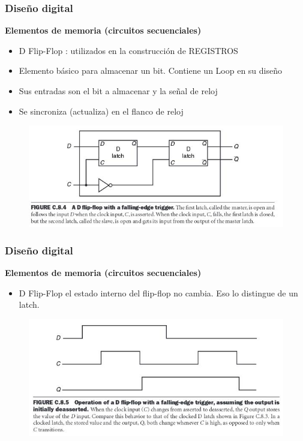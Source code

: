 \documentclass[aspectratio=169,compress]{beamer}
\begin{document}
\begin{footnotesize}
\begin{frame}[fragile]
\frametitle{Diseño digital}
\begin{center}\textbf{Elementos de memoria (circuitos secuenciales)}\end{center}
\begin{itemize}
\item D Flip-Flop : utilizados en la construcción de REGISTROS
\item Elemento básico para almacenar un bit. Contiene un Loop en su diseño
\item Sus entradas son el bit a almacenar y la señal de reloj
\item Se sincroniza (actualiza) en el flanco de reloj
\end{itemize}
\begin{figure}
\includegraphics[scale=0.4]{images/flip-flop-d.jpg} 
\end{figure}
\end{frame}

\begin{frame}[fragile]
\frametitle{Diseño digital}
\begin{center}\textbf{Elementos de memoria (circuitos secuenciales)}\end{center}
\begin{itemize}
\item D Flip-Flop
el estado interno del flip-flop no cambia. Eso lo distingue de un latch.
\end{itemize}
\begin{figure}
\includegraphics[scale=0.4]{images/flip-flop-d-tiempo.jpg} 
\end{figure}
\end{frame}


\end{footnotesize}
\end{document}
